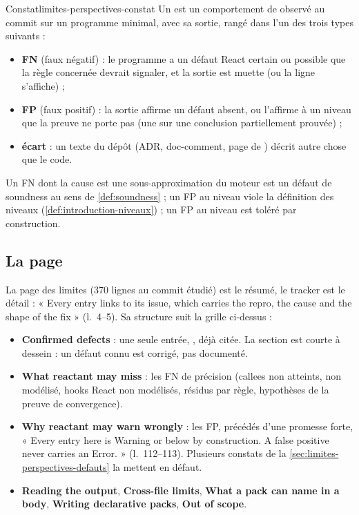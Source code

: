 \begin{definition}{Constat}{limites-perspectives-constat}
Un  est un comportement de \reactant{} observé au commit \snapshotCommit{} sur un programme minimal, avec sa sortie, rangé dans l'un des trois types suivants :
\begin{itemize}
\item \textbf{FN} (faux négatif) : le programme a un défaut React certain ou possible que la règle concernée devrait signaler, et la sortie est muette (ou la ligne  s'affiche) ;
\item \textbf{FP} (faux positif) : la sortie affirme un défaut absent, ou l'affirme à un niveau que la preuve ne porte pas (une \Error{} sur une conclusion partiellement prouvée) ;
\item \textbf{écart} : un texte du dépôt (ADR, doc-comment, page de ) décrit autre chose que le code.
\end{itemize}
Un FN dont la cause est une sous-approximation du moteur est un défaut de soundness au sens de \cref{def:soundness} ; un FP au niveau \Error{} viole la définition des niveaux (\cref{def:introduction-niveaux}) ; un FP au niveau \Warning{} est toléré par construction.
\end{definition}

\subsection{La page \texorpdfstring{}{docs/limitations.md}}

La page des limites (370 lignes au commit étudié) est le résumé, le tracker est le détail : « Every entry links to its issue, which carries the repro, the cause and the shape of the fix » (l.~4--5). Sa structure suit la grille ci-dessus :
\begin{itemize}
\item \textbf{Confirmed defects} : une seule entrée, , déjà citée. La section est courte à dessein : un défaut connu est corrigé, pas documenté.
\item \textbf{What reactant may miss} : les FN de précision (callees non atteints,  non modélisé, hooks React non modélisés, résidus par règle, hypothèses de la preuve de convergence).
\item \textbf{Why reactant may warn wrongly} : les FP, précédés d'une promesse forte, « Every entry here is Warning or below by construction. A false positive never carries an Error. » (l.~112--113). Plusieurs constats de la \cref{sec:limites-perspectives-defauts} la mettent en défaut.
\item \textbf{Reading the output}, \textbf{Cross-file limits}, \textbf{What a pack can name in a body}, \textbf{Writing declarative packs}, \textbf{Out of scope}.
\end{itemize}

